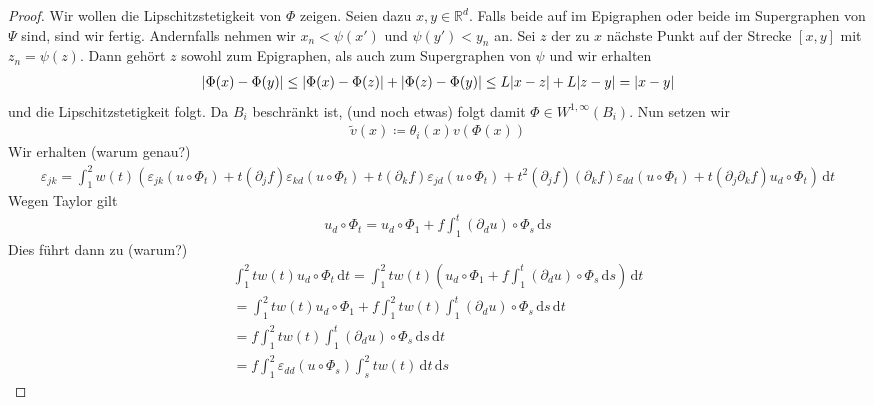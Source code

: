 \documentclass{scrartcl}
\def\R{\mathbb{R}}
\def\e{\varepsilon}
\newcommand{\dif}[1]{\,\mathrm{d} #1}
\DeclarePairedDelimiter{\abs}{|}{|}
\begin{document}
\begin{proof}
	Wir wollen die Lipschitzstetigkeit von $\Phi$ zeigen. Seien dazu $x,y\in\R^d$. Falls beide auf im Epigraphen oder beide im Supergraphen von $\Psi$ sind, sind wir fertig. Andernfalls nehmen wir $x_n<\psi(x')$ und $\psi(y')<y_n$ an. Sei $z$ der zu $x$ nächste Punkt auf der Strecke $[x,y]$ mit $z_n=\psi(z)$. Dann gehört $z$ sowohl zum Epigraphen, als auch zum Supergraphen von $\psi$ und wir erhalten
	\begin{align*}
		\abs{\Phi(x)-\Phi(y)}\leq\abs{\Phi(x)-\Phi(z)}+\abs{\Phi(z)-\Phi(y)}\leq L\abs{x-z}+L\abs{z-y} =\abs{x-y}
	\end{align*}
	und die Lipschitzstetigkeit folgt. Da $B_i$ beschränkt ist, (und noch etwas) folgt damit $\Phi\in W^{1,\infty}(B_i)$. Nun setzen wir 
	\begin{align*}
		\tilde{v}(x)\coloneqq\theta_i(x)v(\Phi(x))
	\end{align*}
	Wir erhalten (warum genau?)
	\begin{align*}
		\e_{jk} = \int_1^2w(t)\left(\e_{jk}(u\circ \Phi_t)+t(\partial_jf)\e_{kd}(u\circ \Phi_t)+t(\partial_kf)\e_{jd}(u\circ \Phi_t)+t^2(\partial_jf)(\partial_kf)\e_{dd}(u\circ \Phi_t)+t(\partial_{j}\partial_kf)u_d\circ\Phi_t\right)\dif t
	\end{align*}
	Wegen Taylor gilt
	\begin{align*}
		u_d\circ\Phi_t = u_d\circ\Phi_1+f\int_1^t(\partial_du)\circ\Phi_s\dif s
	\end{align*}
	Dies führt dann zu (warum?)
	\begin{align*}
		\int_1^2tw(t)u_d\circ \Phi_t\dif t
		= \int_1^2tw(t)\left(u_d\circ\Phi_1+f\int_1^t(\partial_du)\circ\Phi_s\dif s\right)\dif t \\
		= \int_1^2tw(t)u_d\circ\Phi_1+f\int_1^2tw(t)\int_1^t(\partial_du)\circ\Phi_s\dif s\dif t \\
		= f\int_1^2tw(t)\int_1^t(\partial_du)\circ\Phi_s\dif s\dif t\\
		= f\int_1^2\e_{dd}(u\circ\Phi_s)\int_s^2tw(t)\dif t\dif s
	\end{align*}
	

\end{proof}
\end{document}
